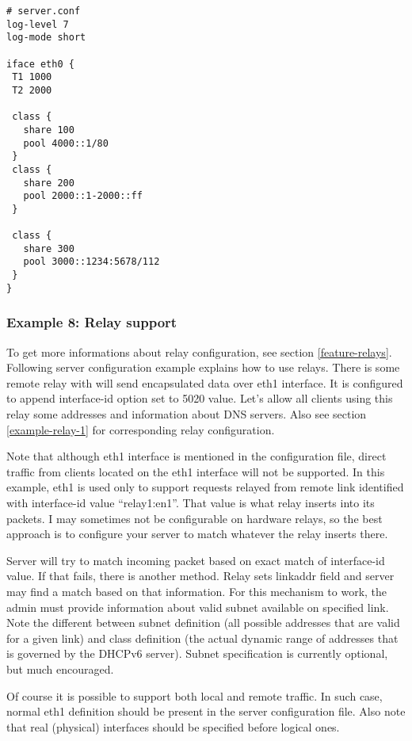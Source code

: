 \begin{lstlisting}
# server.conf
log-level 7
log-mode short

iface eth0 {
 T1 1000
 T2 2000

 class {
   share 100
   pool 4000::1/80
 }
 class {
   share 200
   pool 2000::1-2000::ff
 }

 class {
   share 300
   pool 3000::1234:5678/112
 }
}
\end{lstlisting}

\subsubsection{Example 8: Relay support}
\label{example-server-relay1}
To get more informations about relay configuration, see section \ref{feature-relays}.
Following server configuration example explains how to use
relays. There is some remote relay with will send encapsulated data over
eth1 interface. It is configured to append interface-id option set to
5020 value. Let's allow all clients using this relay some addresses
and information about DNS servers. Also see section
\ref{example-relay-1} for corresponding relay configuration.

Note that although eth1 interface is mentioned in the configuration file,
direct traffic from clients located on the eth1 interface will not be
supported. In this example, eth1 is used only to support requests
relayed from remote link identified with interface-id value
``relay1:en1''. That value is what relay inserts into its packets. I
may sometimes not be configurable on hardware relays, so the best
approach is to configure your server to match whatever the relay
inserts there.

Server will try to match incoming packet based on exact match of
interface-id value. If that fails, there is another method. Relay sets
linkaddr field and server may find a match based on that
information. For this mechanism to work, the admin must provide
information about valid subnet available on specified link. Note the
different between subnet definition (all possible addresses that are
valid for a given link) and class definition (the actual dynamic range
of addresses that is governed by the DHCPv6 server). Subnet
specification is currently optional, but much encouraged.

Of course it is possible to support both local and remote traffic. In
such case, normal eth1 definition should be present in the server
configuration file. Also note that real (physical) interfaces should
be specified before logical ones.

